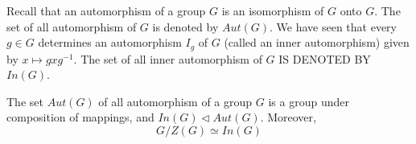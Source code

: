 Recall that an automorphism of a group $G$ is an isomorphism of $G$ onto $G$. The set of all automorphism of $G$ is denoted by $Aut(G)$. We have seen that every $g\in G$ determines an automorphism $I_g$ of $G$ (called an inner automorphism) given by $x\mapsto gxg^{-1}$. The set of all inner automorphism of $G$ IS DENOTED BY $In(G)$.
\begin{teo}
    The set $Aut(G)$ of all automorphism of a group $G$ is a group under composition of mappings, and $In(G)\vartriangleleft Aut(G)$. Moreover, 
    \begin{equation*}
        G/Z(G)\simeq In(G)
    \end{equation*}
\end{teo}